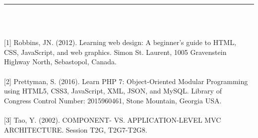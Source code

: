 \documentclass[12pt]{report}
\begin{document}
\newpage

\vspace*{-0.2in}

\begin{center}
    {\color{Blue} \rule{5.5in}{1.4mm} }\\
    \vspace{0.1in}
    \scshape{\fontsize{34}{46}{\bfseries{\color{Blue}{Bibliographie}}}}
    \\
    \vspace{0.5in}
\end{center}
\large
\renewcommand{\ULdepth}{1.8pt}

{[1]} \quad Robbins, JN. (2012). Learning web design: A beginner's guide to HTML,
\\
\hspace*{0.43in}
CSS, JavaScript, and web graphics. Simon St. Laurent, 1005 Gravenstein
\\
\hspace*{0.43in}
Highway North, Sebastopol, Canada.
\\\\
{[2]} \quad Prettyman, S. (2016). Learn PHP 7: Object-Oriented Modular Programming
\\
\hspace*{0.43in}
using HTML5, CSS3, JavaScript, XML, JSON, and MySQL. Library of
\\
\hspace*{0.43in}
Congress Control Number: 2015960461, Stone Mountain, Georgia USA.
\\\\
{[3]} \quad Tao, Y. (2002). COMPONENT- VS. APPLICATION-LEVEL MVC
\\
\hspace*{0.43in}
ARCHITECTURE. Session T2G, T2G7-T2G8.

\newpage

\vspace*{-0.2in}
\end{document}
